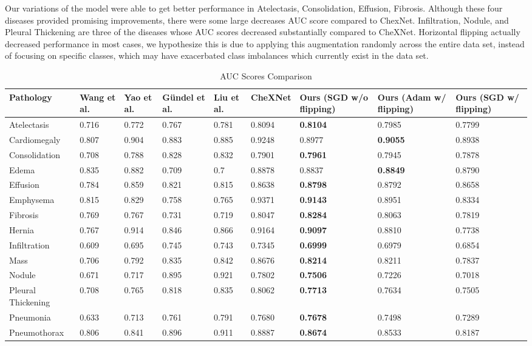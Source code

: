 \documentclass{amia}
\begin{document}
Our variations of the model were able to get better performance in Atelectasis, Consolidation, Effusion, Fibrosis. Although these four diseases provided promising improvements, there were some large decreases AUC score compared to ChexNet. Infiltration, Nodule, and Pleural Thickening are three of the diseases whose AUC scores decreased substantially compared to CheXNet. Horizontal flipping actually decreased performance in most cases, we hypothesize this is due to applying this augmentation randomly across the entire data set, instead of focusing on specific classes, which may have exacerbated class imbalances which currently exist in the data set.

\begin{table}[H]
\begin{tabular}{p{3cm}|p{1.5cm}|p{1.5cm}|p{1.5cm}|p{1.5cm}|p{1.5cm}|p{1.5cm}|p{1.5cm}|p{1.5cm}}
Pathology & Wang et al.\cite{ref7} & Yao et al.\cite{ref8} & Gündel et al.\cite{ref9} & Liu et al.\cite{ref6} & CheXNet\cite{ref5} & Ours (SGD w/o flipping) & Ours (Adam w/ flipping) & Ours (SGD w/ flipping) \\
\midrule
Atelectasis & 0.716 & 0.772 & 0.767 & 0.781 & 0.8094 & \textbf{0.8104} & 0.7985 & 0.7799 \\
Cardiomegaly & 0.807 & 0.904 & 0.883 & 0.885 & 0.9248 & 0.8977 & \textbf{0.9055} & 0.8938 \\
Consolidation & 0.708 & 0.788 & 0.828 & 0.832 & 0.7901 & \textbf{0.7961} & 0.7945 & 0.7878 \\
Edema & 0.835 & 0.882 & 0.709 & 0.7 & 0.8878 & 0.8837 & \textbf{0.8849} & 0.8790 \\
Effusion & 0.784 & 0.859 & 0.821 & 0.815 & 0.8638 & \textbf{0.8798} & 0.8792 & 0.8658 \\
Emphysema & 0.815 & 0.829 & 0.758 & 0.765 & 0.9371 & \textbf{0.9143} & 0.8951 & 0.8334 \\
Fibrosis & 0.769 & 0.767 & 0.731 & 0.719 & 0.8047 & \textbf{0.8284} & 0.8063 & 0.7819 \\
Hernia & 0.767 & 0.914 & 0.846 & 0.866 & 0.9164 & \textbf{0.9097} & 0.8810 & 0.7738 \\
Infiltration & 0.609 & 0.695 & 0.745 & 0.743 & 0.7345 & \textbf{0.6999} & 0.6979 & 0.6854 \\
Mass & 0.706 & 0.792 & 0.835 & 0.842 & 0.8676 & \textbf{0.8214} & 0.8211 & 0.7837 \\
Nodule & 0.671 & 0.717 & 0.895 & 0.921 & 0.7802 & \textbf{0.7506} & 0.7226 & 0.7018 \\
Pleural Thickening & 0.708 & 0.765 & 0.818 & 0.835 & 0.8062 & \textbf{0.7713} & 0.7634 & 0.7505 \\
Pneumonia & 0.633 & 0.713 & 0.761 & 0.791 & 0.7680 & \textbf{0.7678} & 0.7498 & 0.7289 \\
Pneumothorax & 0.806 & 0.841 & 0.896 & 0.911 & 0.8887 & \textbf{0.8674} & 0.8533 & 0.8187 \\
\end{tabular}
\caption{\label{table:tableauc}AUC Scores Comparison}
\end{table}
\end{document}
